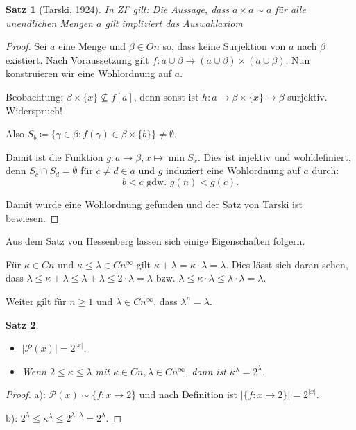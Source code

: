 \documentclass[german]{article}
\theoremstyle{break}
\theoremstyle{def_style}
\theoremstyle{def_style}
\newtheorem{satz}{Satz}[section]
\theoremstyle{lemma_style}
\newcommand{\Pot}[1]{\mathcal{P}(#1)}
\begin{document}
\begin{satz}[Tarski, 1924]
	In ZF gilt: Die Aussage, dass $a\times a\sim a$ für alle unendlichen Mengen $a$ gilt impliziert das Auswahlaxiom
\end{satz}
\begin{proof}
	Sei $a$ eine Menge und $\beta\in On$ so, dass keine Surjektion von $a$ nach $\beta$ existiert. Nach Voraussetzung gilt $f:a\cup \beta \to (a\cup \beta)\times(a\cup\beta)$. Nun konstruieren wir eine Wohlordnung auf $a$.
	
	Beobachtung: $\beta\times\{x\}\not\subseteq f[a]$, denn sonst ist $h:a\to \beta\times\{x\}\to \beta$ surjektiv. Widerspruch!
	
	Also $S_b\coloneqq\{\gamma\in\beta : f(\gamma)\in\beta\times\{b\}\}\neq\emptyset$.
	
	Damit ist die Funktion $g:a\to\beta, x\mapsto \min S_x$. Dies  ist injektiv und wohldefiniert, denn $S_c\cap S_d=\emptyset$ für $c\neq d\in a$ und $g$ induziert eine Wohlordnung auf $a$ durch:
	$$b<c\text{ gdw. } g(n)<g(c).$$

	Damit wurde eine Wohlordnung gefunden und der Satz von Tarski ist bewiesen.
\end{proof}

Aus dem Satz von Hessenberg lassen sich einige Eigenschaften folgern.

Für $\kappa\in Cn$ und $\kappa\leq\lambda\in Cn^\infty$ gilt $\kappa+\lambda=\kappa\cdot\lambda=\lambda$. 
Dies lässt sich daran sehen, dass $\lambda \leq \kappa+\lambda\leq\lambda+\lambda \leq 2\cdot\lambda =\lambda$ bzw. $\lambda \leq \kappa\cdot\lambda \leq \lambda\cdot\lambda = \lambda$.

Weiter gilt für $n\geq 1$ und $\lambda \in Cn^\infty$, dass $\lambda^n=\lambda$.

\begin{satz}
	\begin{itemize}
		\item[a)] $\vert \Pot{x} \vert = 2^{\vert x \vert}$.
		\item[b)] Wenn $2\leq \kappa \leq \lambda$ mit $\kappa\in Cn, \lambda\in Cn^\infty$, dann ist $\kappa^\lambda=2^\lambda$.
	\end{itemize}
\end{satz}
\begin{proof}
		a): $\Pot{x}\sim\{f:x\to2\}$ und nach Definition ist $\vert\{f:x\to 2\}\vert=2^{\vert x \vert}$.
		
		b): $2^\lambda \leq \kappa^\lambda \leq 2^{\lambda\cdot\lambda}=2^\lambda$.
\end{proof}
\end{document}
